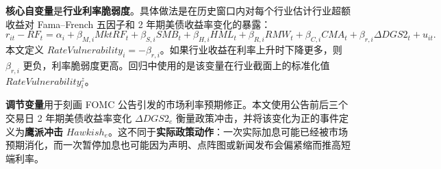 \documentclass[UTF8,zihao=-4]{ctexart}
\begin{document}
\textbf{核心自变量}是\textbf{行业利率脆弱度}。具体做法是在历史窗口内对每个行业估计行业超额收益对 Fama--French 五因子和 2 年期美债收益率变化的暴露：
\[
r_{it}-RF_t=\alpha_i+\beta_{M,i}MktRF_t+\beta_{S,i}SMB_t+\beta_{H,i}HML_t
+\beta_{R,i}RMW_t+\beta_{C,i}CMA_t+\beta_{r,i}\Delta DGS2_t+u_{it}.
\]
本文定义 $RateVulnerability_i=-\beta_{r,i}$。如果行业收益在利率上升时下降更多，则 $\beta_{r,i}$ 更负，利率脆弱度更高。回归中使用的是该变量在行业截面上的标准化值 $RateVulnerability_{i}^{z}$。

\textbf{调节变量}用于刻画 FOMC 公告引发的市场利率预期修正。本文使用公告前后三个交易日 2 年期美债收益率变化 $\Delta DGS2_e$ 衡量政策冲击，并将该变化为正的事件定义为\textbf{鹰派冲击} $Hawkish_e$。这不同于\textbf{实际政策动作}：一次实际加息可能已经被市场预期消化，而一次暂停加息也可能因为声明、点阵图或新闻发布会偏紧缩而推高短端利率。
\end{document}
